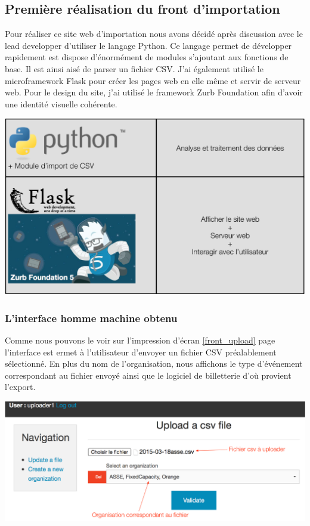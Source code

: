 \subsection{Première réalisation du front d'importation}

Pour réaliser ce site web d'importation nous avons décidé après discussion avec le lead developper d'utiliser le langage Python. Ce langage permet de développer rapidement est dispose d'énormément de modules s'ajoutant aux fonctions de base. Il est ainsi aisé de parser un fichier CSV. J'ai également utilisé le microframework Flask pour créer les pages web en elle même et servir de serveur web. Pour le design du site, j'ai utilisé le framework Zurb Foundation afin d'avoir une identité visuelle cohérente. 

\begin{center}
\includegraphics[scale=0.6]{images/datafit2.png}
\label{interface_upload_tech}
\end{center}

\subsubsection{L'interface homme machine obtenu}

Comme nous pouvons le voir sur l'impression d'écran \ref{front_upload} page \pageref{front_upload} l'interface est ermet à l'utilisateur d'envoyer un fichier CSV préalablement sélectionné.
En plus du nom de l'organisation, nous affichons le type d'événement correspondant au fichier envoyé ainsi que le logiciel de billetterie d'où provient l'export. \\

\begin{center}
\includegraphics[scale=0.6]{images/front1.png}
\label{front_upload}
\end{center}

